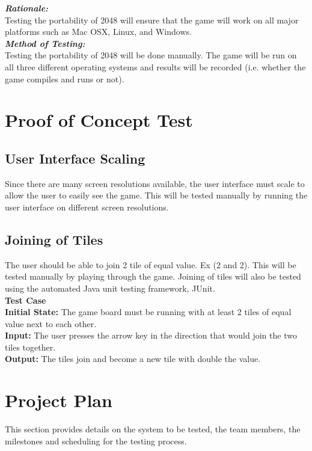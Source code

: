 \documentclass[12pt]{article}
\begin{document}
\textbf{\emph{Rationale:}}\\
Testing the portability of 2048 will ensure that the game will work on all 
major platforms such as Mac OSX, Linux, and Windows. \\

\textbf{\emph{Method of Testing:}}\\
Testing the portability of 2048 will be done manually. The game will be run on 
all three different operating systems and results will be recorded (i.e. 
whether the game compiles and runs or not).


\section{Proof of Concept Test}

\subsection{User Interface Scaling}
Since there are many screen resolutions available, the user interface must 
scale to allow the user to easily see the game. This will be tested manually by 
running the user interface on different screen resolutions.

\subsection{Joining of Tiles}
The user should be able to join 2 tile of equal value. Ex (2 and 2). This will 
be tested manually by playing through the game. Joining of tiles will also be 
tested using the automated Java unit testing framework, JUnit.\\

\textbf{Test Case}\\
\textbf{Initial State:} The game board must be running with at least 2 tiles of 
equal value next to each other. \\
\textbf{Input:} The user presses the arrow key in the direction that would join 
the two tiles together. \\
\textbf{Output:} The tiles join and become a new tile with double the value.\\

\section{Project Plan}
This section provides details on the system to be tested, the team members, the 
milestones and scheduling for the testing process.
\end{document}
